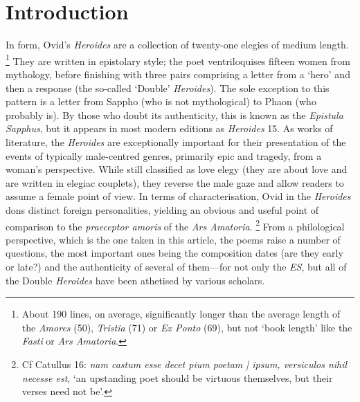 \documentclass[twocolumn, switch, a4paper]{article} %
\begin{document}

\section{Introduction}

In form, Ovid's \emph{Heroides} are a collection of twenty-one elegies of
medium length.%
%
    \footnote{ About 190 lines, on average, significantly longer than the
    average length of the \emph{Amores} (50), \emph{Tristia} (71) or \emph{Ex
    Ponto} (69), but not `book length' like the \emph{Fasti} or \emph{Ars
    Amatoria}.}
%
They are written in epistolary style; the poet ventriloquises fifteen women
from mythology, before finishing with three pairs comprising a letter from a
`hero' and then a response (the so-called `Double' \emph{Heroides}). The sole
exception to this pattern is a letter from Sappho (who is not mythological) to
Phaon (who probably is). By those who doubt its authenticity, this is known as
the \emph{Epistula Sapphus}, but it appears in most modern editions as
\emph{Heroides} 15. As works of literature, the \emph{Heroides} are
exceptionally important for their presentation of the events of typically
male-centred genres, primarily epic and tragedy, from a woman's perspective.
While still classified as love elegy (they are about love and are written in
elegiac couplets), they reverse the male gaze and allow readers to assume a
female point of view. In terms of characterisation, Ovid in the
\emph{Heroides} dons distinct foreign personalities, yielding an obvious and
useful point of comparison to the \emph{praeceptor amoris} of the \emph{Ars
Amatoria}.%
%
    \footnote{Cf Catullus 16: \emph{nam castum esse decet pium poetam | ipsum,
    versiculos nihil necesse est}, `an upstanding poet should be virtuous
    themselves, but their verses need not be'.}
%
From a philological perspective, which is the one taken in this article, the
poems raise a number of questions, the most important ones being the
composition dates (are they early or late?) and the authenticity of several of
them---for not only the \emph{ES}, but all of the Double \emph{Heroides} have
been athetised by various scholars.
\end{document}
